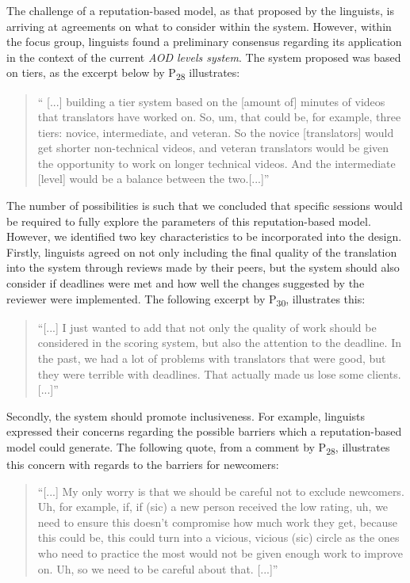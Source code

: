 The challenge of a reputation-based model, as that proposed by the linguists, is arriving at agreements on what to consider within the system. However, within the focus group, linguists found a preliminary consensus regarding its application in the context of the current \textit{AOD levels system}. The system proposed was based on tiers, as the excerpt below by P\textsubscript{28} illustrates:

\begin{quote}
    `` [...] building a tier system based on the [amount of] minutes of videos that translators have worked on. So, um, that could be, for example, three tiers: novice, intermediate, and veteran. So the novice [translators]  would get shorter non-technical videos, and veteran translators would be given the opportunity to work on longer technical videos. And the intermediate [level] would be a balance between the two.[...]''
\end{quote}

The number of possibilities is such that we concluded that specific sessions would be required to fully explore the parameters of this reputation-based model. However, we identified two key characteristics to be incorporated into the design. Firstly, linguists agreed on not only including the final quality of the translation into the system through reviews made by their peers, but the system should also consider if deadlines were met and how well the changes suggested by the reviewer were implemented. The following excerpt by P\textsubscript{30}, illustrates this:

\begin{quote}
   ``[...] I just wanted to add that not only the quality of work should be considered in the scoring system, but also the attention to the deadline. In the past, we had a lot of problems with translators that were good, but they were terrible with deadlines. That actually made us lose some clients.[...]''
\end{quote}

Secondly, the system should promote inclusiveness. For example, linguists expressed their concerns regarding the possible barriers which a reputation-based model could generate. The following quote, from a comment by P\textsubscript{28}, illustrates this concern with regards to the barriers for newcomers:

\begin{quote}
   ``[...] My only worry is that we should be careful not to exclude newcomers. Uh, for example, if, if (sic) a new person received the low rating, uh, we need to ensure this doesn't compromise how much work they get, because this could be, this could turn into a vicious, vicious (sic) circle as the ones who need to practice the most would not be given enough work to improve on. Uh, so  we need to be careful about that. [...]''
\end{quote}

